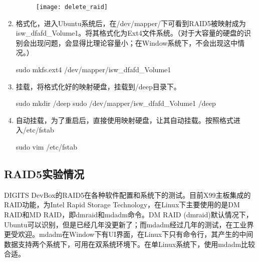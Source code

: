\begin{enumerate}
\begin{figure}[!ht]
\centering
\texttt{[image: delete\_raid]}
\end{figure}
\item 格式化，进入Ubuntu系统后，在/dev/mapper/下可看到RAID5被映射成为isw\_dfafd\_Volume1。将其格式化为Ext4文件系统。（对于大容量的硬盘的识别会出现问题，会显得比理论容量小；在Window系统下，不会出现这中情况。）
\begin{bash}
sudo mkfs.ext4 /dev/mapper/isw_dfafd_Volume1
\end{bash}
\item 挂载，将格式化好的映射硬盘，挂载到/deep目录下。
\begin{bash}
sudo mkdir /deep
sudo /dev/mapper/isw_dfafd_Volume1 /deep
\end{bash}
\item 自动挂载，为了重启后，直接使用映射硬盘，让其自动挂载。按照格式进入/etc/fstab
\begin{bash}
sudo vim /etc/fstab
\end{bash}
\end{enumerate}

\subsection{RAID5实验情况}
DIGITS DevBox的RAID5在各种软件配置和系统下的测试。目前X99主板集成的RAID功能，为Intel Rapid Storage Technology，在Linux下主要使用的是DM RAID和MD RAID，即dmraid和mdadm命令。DM RAID (dmraid)默认情况下，Ubuntu可以识别，但是已经几年没更新了；而mdadm经过几年的测试，在工业界更受欢迎。mdadm在Window下有UI界面，在Linux下只有命令行，其产生的中间数据支持两个系统下，可用在双系统环境下。在单Linux系统下，使用mdadm比较合适。


